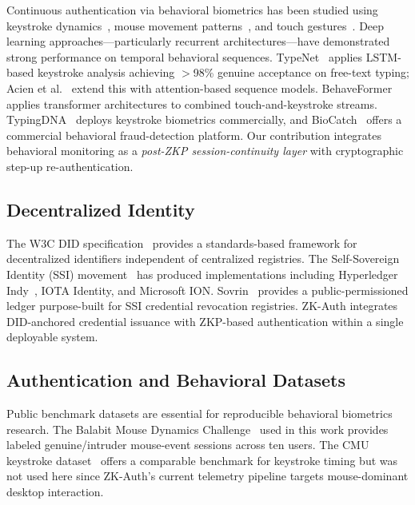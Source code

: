 \documentclass[journal,twoside,10pt]{IEEEtran}
\begin{document}
Continuous authentication via behavioral biometrics has been studied using
keystroke dynamics~\cite{shepherd95,monrose00}, mouse movement
patterns~\cite{nakkabi11,ahmed07}, and touch gestures~\cite{frank13}. Deep
learning approaches---particularly recurrent architectures---have
demonstrated strong performance on temporal behavioral sequences. TypeNet~\cite{typenet}
applies LSTM-based keystroke analysis achieving $>$98\% genuine acceptance
on free-text typing; Acien et al.~\cite{acien21} extend this with
attention-based sequence models.
BehaveFormer~\cite{behaveformer} applies transformer architectures to
combined touch-and-keystroke streams.
TypingDNA~\cite{typingdna} deploys keystroke biometrics commercially, and BioCatch~\cite{biocatch} offers a commercial behavioral
fraud-detection platform. Our
contribution integrates behavioral monitoring as a \textit{post-ZKP
session-continuity layer} with cryptographic step-up re-authentication.

\subsection{Decentralized Identity}

The W3C DID specification~\cite{w3cdid} provides a standards-based framework
for decentralized identifiers independent of centralized registries. The
Self-Sovereign Identity (SSI) movement~\cite{allen16} has produced
implementations including Hyperledger Indy~\cite{hyperledgerindy}, IOTA
Identity, and Microsoft ION. Sovrin~\cite{sovrin} provides a
public-permissioned ledger purpose-built for SSI credential revocation
registries. ZK-Auth
integrates DID-anchored credential issuance with ZKP-based authentication
within a single deployable system.

\subsection{Authentication and Behavioral Datasets}

Public benchmark datasets are essential for reproducible behavioral
biometrics research. The Balabit Mouse Dynamics Challenge~\cite{balabit}
used in this work provides labeled genuine/intruder mouse-event sessions
across ten users. The CMU keystroke dataset~\cite{killourhy09} offers a
comparable benchmark for keystroke timing but was not used here since
ZK-Auth's current telemetry pipeline targets mouse-dominant desktop
interaction.

\end{document}
